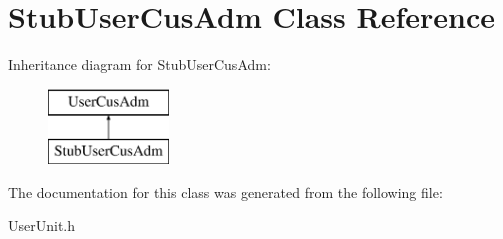 \hypertarget{classStubUserCusAdm}{\section{Stub\-User\-Cus\-Adm Class Reference}
\label{d1/d9d/classStubUserCusAdm}
}
Inheritance diagram for Stub\-User\-Cus\-Adm\-:\begin{figure}[H]
\begin{center}
\leavevmode
\includegraphics[height=2.000000cm]{d1/d9d/classStubUserCusAdm}
\end{center}
\end{figure}


The documentation for this class was generated from the following file\-:\begin{DoxyCompactItemize}
\item 
User\-Unit.\-h\end{DoxyCompactItemize}
